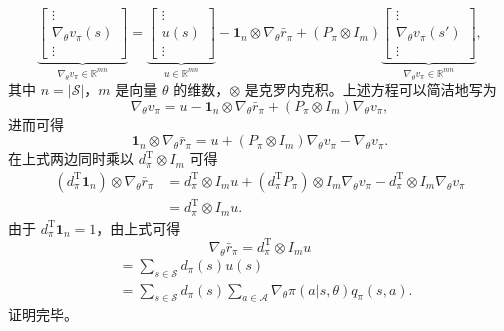 \begin{note}
\begin{equation}
\underbrace{\left[ \begin{array}{c} \vdots \\ \nabla_{\theta} v_{\pi}(s) \\ \vdots \end{array} \right]}_{\nabla_{\theta} v_{\pi} \in \mathbb{R}^{mn}} = \underbrace{\left[ \begin{array}{c} \vdots \\ u(s) \\ \vdots \end{array} \right]}_{u \in \mathbb{R}^{mn}} - \mathbf{1}_n \otimes \nabla_{\theta} \bar{r}_{\pi} + (P_{\pi} \otimes I_m) \underbrace{\left[ \begin{array}{c} \vdots \\ \nabla_{\theta} v_{\pi}(s') \\ \vdots \end{array} \right]}_{\nabla_{\theta} v_{\pi} \in \mathbb{R}^{mn}},
\end{equation}
其中 $n = |\mathcal{S}|$，$m$ 是向量 $\theta$ 的维数，$\otimes$ 是克罗内克积。上述方程可以简洁地写为
\begin{equation}
\nabla_{\theta} v_{\pi} = u - \mathbf{1}_n \otimes \nabla_{\theta} \bar{r}_{\pi} + (P_{\pi} \otimes I_m) \nabla_{\theta} v_{\pi},
\end{equation}
进而可得
\begin{equation}
\mathbf{1}_n \otimes \nabla_{\theta} \bar{r}_{\pi} = u + (P_{\pi} \otimes I_m) \nabla_{\theta} v_{\pi} - \nabla_{\theta} v_{\pi}.
\end{equation}
在上式两边同时乘以 $d_{\pi}^{\mathrm{T}}\otimes I_m$ 可得
\begin{equation}
\begin{aligned}
(d_{\pi}^{\mathrm{T}} \mathbf{1}_n) \otimes \nabla_{\theta} \bar{r}_{\pi} &= d_{\pi}^{\mathrm{T}} \otimes I_m u + (d_{\pi}^{\mathrm{T}} P_{\pi}) \otimes I_m \nabla_{\theta} v_{\pi} - d_{\pi}^{\mathrm{T}} \otimes I_m \nabla_{\theta} v_{\pi} \\
&= d_{\pi}^{\mathrm{T}} \otimes I_m u.
\end{aligned}
\end{equation}
由于 $d_{\pi}^{\mathrm{T}}\mathbf{1}_n = 1$，由上式可得
\begin{equation}
\nabla_{\theta} \bar{r}_{\pi} = d_{\pi}^{\mathrm{T}} \otimes I_m u
\end{equation}
\begin{equation}
\begin{aligned}
&= \sum_{s \in \mathcal{S}} d_{\pi}(s) u(s) \\
&= \sum_{s \in \mathcal{S}} d_{\pi}(s) \sum_{a \in \mathcal{A}} \nabla_{\theta} \pi(a|s,\theta) q_{\pi}(s,a).
\end{aligned}
\end{equation}
证明完毕。
\end{note}

